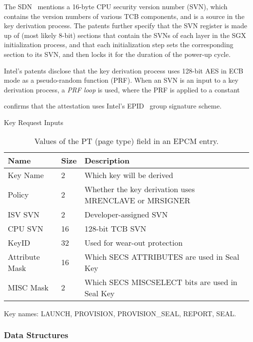 The SDN~\cite{intel2015sdm} mentions a 16-byte CPU security version number
(SVN), which contains the version numbers of various TCB components, and is a
source in the key derivation process. The patents further specify that the SVN
register is made up of (most likely 8-bit) sections that contain the SVNs of
each layer in the SGX initialization process, and that each initialization step
sets the corresponding section to its SVN, and then locks it for the duration
of the power-up cycle.

Intel's patents disclose that the key derivation process uses 128-bit AES in
ECB mode as a pseudo-random function (PRF). When an SVN is an input to a key
derivation process, a \textit{PRF loop} is used, where the PRF is applied to
a constant



\cite{anati2013sgx} confirms that the attestation uses Intel's
EPID~\cite{brickell2009epid} group signature scheme.


Key Request Inputs

\begin{table}[hbt]
  \centering
  \begin{tabularx}{\columnwidth}{| l | l | X |}
  \hline
  \textbf{Name} & \textbf{Size} & \textbf{Description}\\
  \hline
  Key Name & 2 & Which key will be derived \\
  \hline
  Policy & 2 & Whether the key derivation uses MRENCLAVE or MRSIGNER \\
  \hline
  ISV SVN & 2 & Developer-assigned SVN \\
  \hline
  CPU SVN & 16 & 128-bit TCB SVN \\
  \hline
  KeyID & 32 & Used for wear-out protection \\
  \hline
  Attribute Mask & 16 & Which SECS ATTRIBUTES are used in Seal Key \\
  \hline
  MISC Mask & 2 & Which SECS MISCSELECT bits are used in Seal Key \\
  \hline
  \end{tabularx}
  \caption{Values of the PT (page type) field in an EPCM entry.}
  \label{fig:key_request_inputs}
\end{table}

Key names: LAUNCH, PROVISION, PROVISION\_SEAL, REPORT, SEAL.


\subsubsection{Data Structures}

